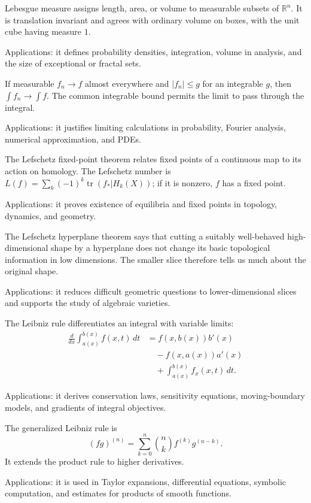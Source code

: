 Lebesgue measure assigns length, area, or volume to measurable subsets of $\mathbb R^n$. It is translation invariant and agrees with ordinary volume on boxes, with the unit cube having measure $1$. \par\noindent Applications: it defines probability densities, integration, volume in analysis, and the size of exceptional or fractal sets.

If measurable $f_n\to f$ almost everywhere and $|f_n|\leq g$ for an integrable $g$, then $\int f_n\to\int f$. The common integrable bound permits the limit to pass through the integral. \par\noindent Applications: it justifies limiting calculations in probability, Fourier analysis, numerical approximation, and PDEs.

The Lefschetz fixed-point theorem relates fixed points of a continuous map to its action on homology. The Lefschetz number is $L(f)=\sum_k(-1)^k\operatorname{tr}(f_*|H_k(X))$; if it is nonzero, $f$ has a fixed point. \par\noindent Applications: it proves existence of equilibria and fixed points in topology, dynamics, and geometry.

The Lefschetz hyperplane theorem says that cutting a suitably well-behaved high-dimensional shape by a hyperplane does not change its basic topological information in low dimensions. The smaller slice therefore tells us much about the original shape. \par\noindent Applications: it reduces difficult geometric questions to lower-dimensional slices and supports the study of algebraic varieties.

The Leibniz rule differentiates an integral with variable limits:
\[
\begin{aligned}
\frac{d}{dx}\int_{a(x)}^{b(x)} f(x,t)\,dt
&= f(x,b(x))b'(x)\\
&\quad-f(x,a(x))a'(x)\\
&\quad+\int_{a(x)}^{b(x)} f_x(x,t)\,dt.
\end{aligned}
\]
\par\noindent Applications: it derives conservation laws, sensitivity equations, moving-boundary models, and gradients of integral objectives.

The generalized Leibniz rule is
\[
(fg)^{(n)}=\sum_{k=0}^n\binom nk f^{(k)}g^{(n-k)}.
\]
It extends the product rule to higher derivatives. \par\noindent Applications: it is used in Taylor expansions, differential equations, symbolic computation, and estimates for products of smooth functions.

